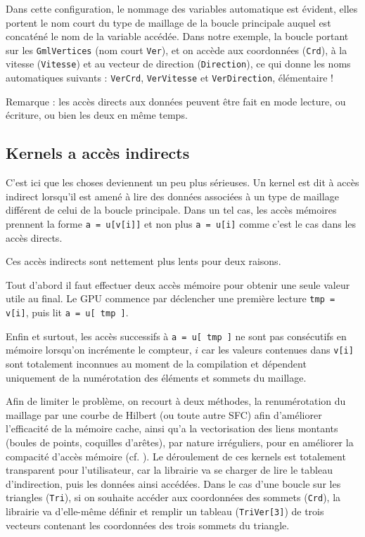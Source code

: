 \documentclass[a4paper,12pt]{article}
\begin{document}
Dans cette configuration, le nommage des variables automatique est évident, elles portent le nom court du type de maillage de la boucle principale auquel est concaténé le nom de la variable accédée.
Dans notre exemple, la boucle portant sur les {\tt GmlVertices} (nom court {\tt Ver}), et on accède aux coordonnées ({\tt Crd}), à la vitesse ({\tt Vitesse}) et au vecteur de direction ({\tt Direction}), ce qui donne les noms automatiques suivants : {\tt VerCrd}, {\tt VerVitesse} et {\tt VerDirection}, élémentaire !

Remarque : les accès directs aux données peuvent être fait en mode lecture, ou écriture, ou bien les deux en même temps.

\subsection{Kernels a accès indirects}
\label{sec:kernels_indirects}
C'est ici que les choses deviennent un peu plus sérieuses.
Un kernel est dit à accès indirect lorsqu'il est amené à lire des données associées à un type de maillage différent de celui de la boucle principale.
Dans un tel cas, les accès mémoires prennent la forme {\tt a = u[v[i]]} et non plus {\tt a = u[i]} comme c'est le cas dans les accès directs.

Ces accès indirects sont nettement plus lents pour deux raisons.

Tout d'abord il faut effectuer deux accès mémoire pour obtenir une seule valeur utile au final.
Le GPU commence par déclencher une première lecture {\tt tmp = v[i]}, puis lit {\tt a = u[ tmp ]}.

Enfin et surtout, les accès successifs à {\tt a = u[ tmp ]} ne sont pas consécutifs en mémoire lorsqu'on incrémente le compteur, $i$ car les valeurs contenues dans {\tt v[i]} sont totalement inconnues au moment de la compilation et dépendent uniquement de la numérotation des éléments et sommets du maillage.

Afin de limiter le problème, on recourt à deux méthodes, la renumérotation du maillage par une courbe de Hilbert (ou toute autre SFC) afin d'améliorer l'efficacité de la mémoire cache, ainsi qu'a la vectorisation des liens montants (boules de points, coquilles d'arêtes), par nature irréguliers, pour en améliorer la compacité d'accès mémoire (cf. \cite{peano_hilbert}).
Le déroulement de ces kernels est totalement transparent pour l'utilisateur, car la librairie va se charger de lire le tableau d'indirection, puis les données ainsi accédées.
Dans le cas d'une boucle sur les triangles ({\tt Tri}), si on souhaite accéder aux coordonnées des sommets ({\tt Crd}), la librairie va d'elle-même définir et remplir un tableau ({\tt TriVer[3]}) de trois vecteurs contenant les coordonnées des trois sommets du triangle.
\end{document}

